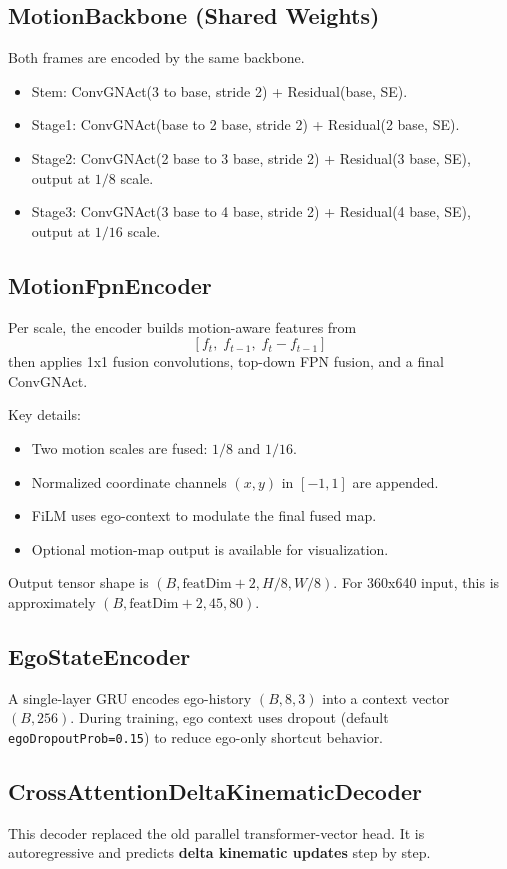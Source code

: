 \documentclass[a4paper,12pt]{article}
\begin{document}
\subsection{MotionBackbone (Shared Weights)}
Both frames are encoded by the same backbone.
\begin{itemize}
    \item Stem: ConvGNAct(3 to base, stride 2) + Residual(base, SE).
    \item Stage1: ConvGNAct(base to 2 base, stride 2) + Residual(2 base, SE).
    \item Stage2: ConvGNAct(2 base to 3 base, stride 2) + Residual(3 base, SE), output at $1/8$ scale.
    \item Stage3: ConvGNAct(3 base to 4 base, stride 2) + Residual(4 base, SE), output at $1/16$ scale.
\end{itemize}

\subsection{MotionFpnEncoder}
Per scale, the encoder builds motion-aware features from
\[
[f_t,\;f_{t-1},\;f_t-f_{t-1}]
\]
then applies 1x1 fusion convolutions, top-down FPN fusion, and a final ConvGNAct.

Key details:
\begin{itemize}
    \item Two motion scales are fused: $1/8$ and $1/16$.
    \item Normalized coordinate channels $(x,y)$ in $[-1,1]$ are appended.
    \item FiLM uses ego-context to modulate the final fused map.
    \item Optional motion-map output is available for visualization.
\end{itemize}

Output tensor shape is $(B,\text{featDim}+2,H/8,W/8)$.
For 360x640 input, this is approximately $(B,\text{featDim}+2,45,80)$.

\subsection{EgoStateEncoder}
A single-layer GRU encodes ego-history $(B,8,3)$ into a context vector $(B,256)$.
During training, ego context uses dropout (default \texttt{egoDropoutProb=0.15}) to reduce ego-only shortcut behavior.

\subsection{CrossAttentionDeltaKinematicDecoder}
This decoder replaced the old parallel transformer-vector head.
It is autoregressive and predicts \textbf{delta kinematic updates} step by step.
\end{document}
